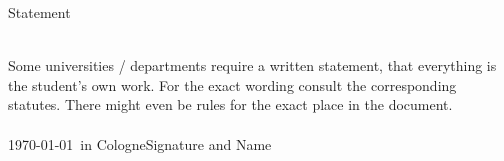 \thispagestyle{empty}
\begin{center}
{\Large Statement}
\end{center}
\ \\
Some universities / departments require a written statement, that everything is the student's own work. For the exact wording consult the corresponding statutes. There might even be rules for the exact place in the document.\\
\ \\
\today\ in Cologne\hfill Signature and Name\\
